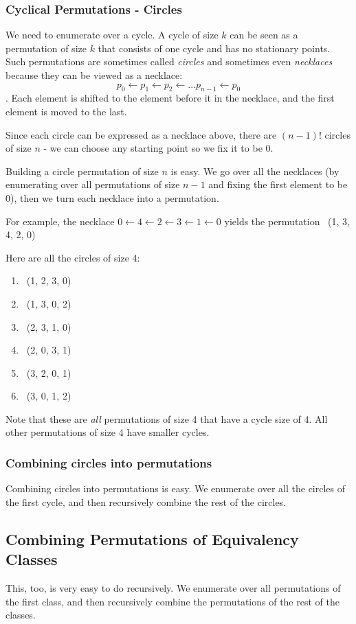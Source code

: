 \documentclass[]{article}
\begin{document}
\subsubsection{Cyclical Permutations - Circles}
We need to enumerate over a cycle. A cycle of size $k$ can be seen as a permutation of size $k$ that consists of one cycle and has no stationary points. Such permutations are sometimes called \emph{circles} and sometimes even \emph{necklaces} because they can be viewed as a necklace: 
\[p_0 \leftarrow p_1 \leftarrow p_2 \leftarrow ... p_{n-1} \leftarrow p_0\]. 
Each element is shifted to the element before it in the necklace, and the first element is moved to the last.

Since each circle can be expressed as a necklace above, there are $(n-1)!$ circles of size $n$ - we can choose any starting point so we fix it to be 0.

Building a circle permutation of size $n$ is easy. We go over all the necklaces (by enumerating over all permutations of size $n-1$ and fixing the first element to be 0), then we turn each necklace into a permutation. 

For example, the necklace $0 \leftarrow 4 \leftarrow 2 \leftarrow 3 \leftarrow 1 \leftarrow 0$ yields the permutation  ~(1, 3, 4, 2, 0)~

Here are all the circles of size 4:
\begin{enumerate}
\item ~(1, 2, 3, 0)~
\item ~(1, 3, 0, 2)~
\item ~(2, 3, 1, 0)~
\item ~(2, 0, 3, 1)~
\item ~(3, 2, 0, 1)~
\item ~(3, 0, 1, 2)~
\end{enumerate}

Note that these are \emph{all} permutations of size 4 that have a cycle size of 4. All other permutations of size 4 have smaller cycles.

\subsubsection{Combining circles into permutations}
Combining circles into permutations is easy. We enumerate over all the circles of the first cycle, and then recursively combine the rest of the circles.

\subsection{Combining Permutations of Equivalency Classes}
This, too, is very easy to do recursively. We enumerate over all permutations of the first class, and then recursively combine the permutations of the rest of the classes.
\end{document}

